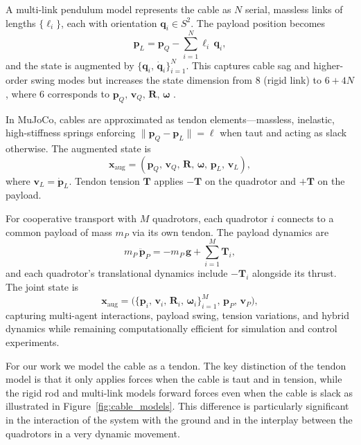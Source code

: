 A multi-link pendulum model represents the cable as \(N\) serial, massless links of lengths \(\{\ell_i\}\), each with orientation \(\mathbf{q}_i\in S^2\). The payload position becomes
\begin{equation}
\mathbf{p}_L = \mathbf{p}_Q - \sum_{i=1}^N \ell_i\,\mathbf{q}_i,
\end{equation}
and the state is augmented by \(\{\mathbf{q}_i,\,\dot{\mathbf{q}}_i\}_{i=1}^N\). This captures cable sag and higher-order swing modes but increases the state dimension from 8 (rigid link) to \(6+4N\), where 6 corresponds to \(\mathbf{p}_Q,\,\mathbf{v}_Q,\,\mathbf{R},\,\boldsymbol{\omega}\) \cite{goodarzi_dynamics_2015}.

In MuJoCo, cables are approximated as tendon elements—massless, inelastic, high-stiffness springs enforcing \(\|\mathbf{p}_Q - \mathbf{p}_L\| = \ell\) when taut and acting as slack otherwise. The augmented state is
\begin{equation}
\mathbf{x}_{\mathrm{aug}} = (\mathbf{p}_Q,\,\mathbf{v}_Q,\,\mathbf{R},\,\boldsymbol{\omega},\,\mathbf{p}_L,\,\mathbf{v}_L),
\end{equation}
where \(\mathbf{v}_L = \dot{\mathbf{p}}_L\). Tendon tension \(\mathbf{T}\) applies \(-\mathbf{T}\) on the quadrotor and \(+\mathbf{T}\) on the payload.

For cooperative transport with \(M\) quadrotors, each quadrotor \(i\) connects to a common payload of mass \(m_P\) via its own tendon. The payload dynamics are
\begin{equation}
m_P \,\ddot{\mathbf{p}}_P = -m_P\,\mathbf{g} + \sum_{i=1}^M \mathbf{T}_i,
\end{equation}
and each quadrotor's translational dynamics include \(-\mathbf{T}_i\) alongside its thrust. The joint state is
\begin{equation}
\mathbf{x}_{\mathrm{aug}} = \bigl(\{\mathbf{p}_i,\,\mathbf{v}_i,\,\mathbf{R}_i,\,\boldsymbol{\omega}_i\}_{i=1}^M,\,\mathbf{p}_P,\,\mathbf{v}_P\bigr),
\end{equation}
capturing multi-agent interactions, payload swing, tension variations, and hybrid dynamics while remaining computationally efficient for simulation and control experiments.

For our work we model the cable as a tendon. The key distinction of the tendon model is that it only applies forces when the cable is taut and in tension, while the rigid rod and multi-link models forward forces even when the cable is slack as illustrated in Figure~\ref{fig:cable_models}. This difference is particularly significant in the interaction of the system with the ground and in the interplay between the quadrotors in a very dynamic movement.